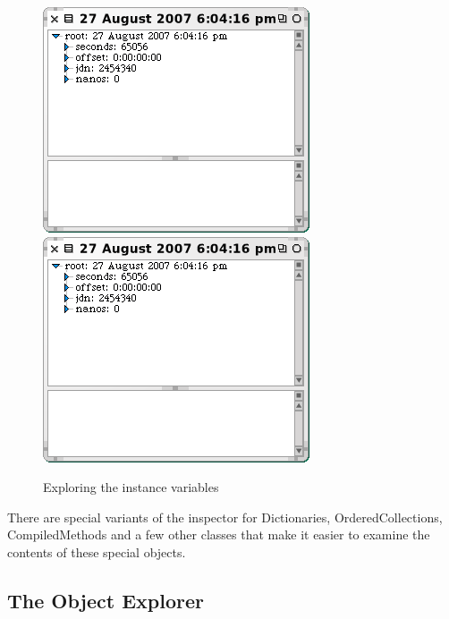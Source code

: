 \documentclass[a4paper,10pt,twoside]{book}
\begin{document}
\begin{figure}[tbp]
\begin{minipage}{0.48\textwidth}
\begin{center}
		{\includegraphics[width=\textwidth]{exploreTimeStampNow2}}
		{\includegraphics[scale=0.7]{exploreTimeStampNow2}}
	\end{center}
	\caption{Exploring the instance variables}
	\label{fig:exploreTimeStampNow2}
\end{minipage}
\end{figure}

There are special variants of the inspector for Dictionaries, OrderedCollections, CompiledMethods and a few other classes that make it easier to examine the contents of these special objects.

\subsection{The Object Explorer}
\end{document}
